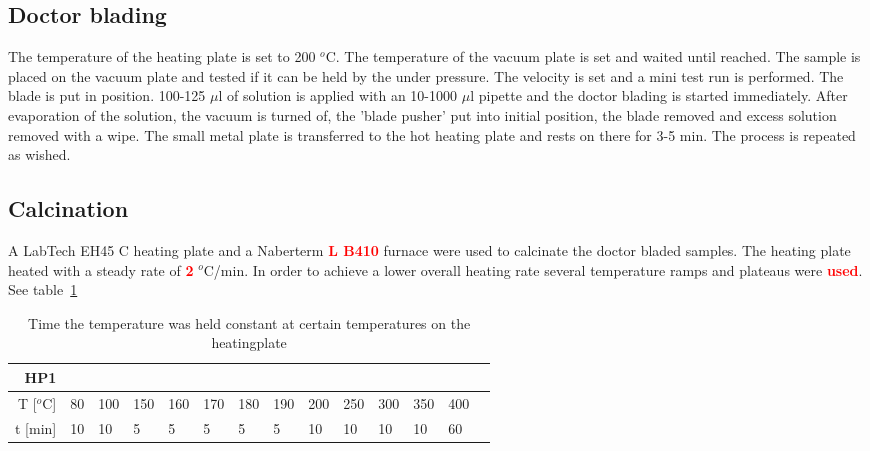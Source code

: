 \documentclass[a4paper]{article}
\newcommand{\todo}[1]{\textbf{\textcolor{red}{#1}}}
\newcommand{\td}[1]{\textbf{\textcolor{red}{#1}}}
\newcommand{\oc}{$^o$C}
\begin{document}
\subsection{Doctor blading}
\label{sec:DB}
The temperature of the heating plate is set to 200 $^o$C.
The temperature of the vacuum plate is set and waited until reached.
The sample is placed on the vacuum plate and tested if it can be held by the under pressure.
The velocity is set and a mini test run is performed. 
The blade is put in position. 
100-125 $\mu$l of solution is applied with an 10-1000 $\mu$l pipette and the doctor blading is started immediately. 
After evaporation of the solution, the vacuum is turned of, the 'blade pusher' put into initial position, the blade removed and excess solution removed with a wipe. 
The small metal plate is transferred to the hot heating plate and rests on there for 3-5 min. 
The process is repeated as wished. 

\subsection{Calcination}
A LabTech EH45 C heating plate and a Naberterm \td{L B410} furnace were used to calcinate the doctor bladed samples. 
The heating plate heated with a steady rate of \td{2} $^o$C/min. 
In order to achieve a lower overall heating rate several temperature ramps and plateaus were \todo{used}. See table~\ref{tab:labtech}


\begin{table}[h]
	\centering
	\begin{tabular}{rl ll ll ll ll ll ll }%
		HP1		&&&&&&&&&&&&&\\
		\hline
		T [\oc]	&80		&100	&150	&160	&170 	&180	&190	&200	&250	&300	&350	&400	\\
		t [min]	&10 	&10		&5 		&5 		&5 		&5 &5 &10 &10 &10 &10 &60 \\
		\hline
	\end{tabular}
	\caption{Time the temperature was held constant at certain temperatures on the heatingplate}
	\label{tab:labtech}
\end{table}
\end{document}
